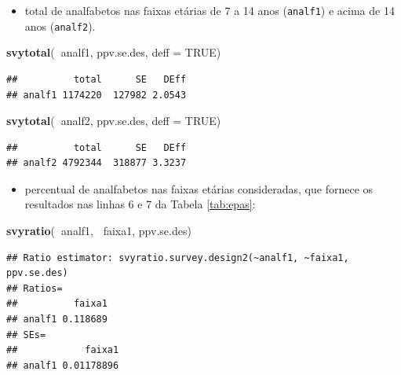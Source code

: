 \documentclass[]{book}
\newenvironment{Shaded}{\begin{snugshade}}{\end{snugshade}}
\newcommand{\KeywordTok}[1]{\textcolor[rgb]{0.13,0.29,0.53}{\textbf{#1}}}
\newcommand{\DataTypeTok}[1]{\textcolor[rgb]{0.13,0.29,0.53}{#1}}
\newcommand{\OtherTok}[1]{\textcolor[rgb]{0.56,0.35,0.01}{#1}}
\newcommand{\OperatorTok}[1]{\textcolor[rgb]{0.81,0.36,0.00}{\textbf{#1}}}
\newcommand{\NormalTok}[1]{#1}
\providecommand{\tightlist}{%
  \setlength{\itemsep}{0pt}\setlength{\parskip}{0pt}}
\theoremstyle{definition}
\theoremstyle{definition}
\theoremstyle{definition}
\theoremstyle{remark}
\begin{document}
\begin{itemize}
\tightlist
\item
  total de analfabetos nas faixas etárias de 7 a 14 anos
  (\texttt{analf1}) e acima de 14 anos (\texttt{analf2}).
\end{itemize}

\begin{Shaded}
\begin{Highlighting}[]
\KeywordTok{svytotal}\NormalTok{(}\OperatorTok{~}\NormalTok{analf1, ppv.se.des, }\DataTypeTok{deff =} \OtherTok{TRUE}\NormalTok{)}
\end{Highlighting}
\end{Shaded}

\begin{verbatim}
##          total      SE   DEff
## analf1 1174220  127982 2.0543
\end{verbatim}

\begin{Shaded}
\begin{Highlighting}[]
\KeywordTok{svytotal}\NormalTok{(}\OperatorTok{~}\NormalTok{analf2, ppv.se.des, }\DataTypeTok{deff =} \OtherTok{TRUE}\NormalTok{)}
\end{Highlighting}
\end{Shaded}

\begin{verbatim}
##          total      SE   DEff
## analf2 4792344  318877 3.3237
\end{verbatim}

\begin{itemize}
\tightlist
\item
  percentual de analfabetos nas faixas etárias consideradas, que fornece
  os resultados nas linhas 6 e 7 da Tabela \ref{tab:epas}:
\end{itemize}

\begin{Shaded}
\begin{Highlighting}[]
\KeywordTok{svyratio}\NormalTok{(}\OperatorTok{~}\NormalTok{analf1, }\OperatorTok{~}\NormalTok{faixa1, ppv.se.des)}
\end{Highlighting}
\end{Shaded}

\begin{verbatim}
## Ratio estimator: svyratio.survey.design2(~analf1, ~faixa1, ppv.se.des)
## Ratios=
##          faixa1
## analf1 0.118689
## SEs=
##            faixa1
## analf1 0.01178896
\end{verbatim}
\end{document}

